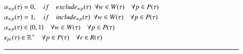 {\begin{alignat}{2}
		& \VarStrategicWorkOrderAssignment{\ElementWorkOrder}{\ElementPeriod} = 0,                                                     \quad if\quad \ParStrategicExclude \ \ \forall \ElementWorkOrder \in \SetWorkOrder{}\quad \forall \ElementPeriod \in \SetPeriod                                                                                                                                                                                              \label{eqn:constraint:strategic:include}\\
		& \VarStrategicWorkOrderAssignment{\ElementWorkOrder}{\ElementPeriod} = 1,                                                            \quad if\quad \ParStrategicInclude \ \ \forall \ElementWorkOrder \in \SetWorkOrder{}\quad \forall \ElementPeriod \in \SetPeriod                                                                                                                                                                                              \label{eqn:strategic:constraint:exclude}\\
		& \VarStrategicWorkOrderAssignment{\ElementWorkOrder}{\ElementPeriod} \in \{0, 1\}                                                   \quad \forall \ElementWorkOrder \in \SetWorkOrder{} \quad \forall \ElementPeriod \in \SetPeriod                                                                                                                                                                           \label{eqn:variable:strategic:assignment}      \\ 
		& \VarStrategicExcess \in \mathbb{R}^{+}                                                                                             \quad \forall \ElementPeriod \in \SetPeriod \quad \forall \ElementResource \in \SetResource                                                                                                                                                                               \label{eqn:variable:strateigc:penalty}\\ 
		& \text{\rule{\linewidth}{0.8pt}} \notag
	\end{alignat}
}
